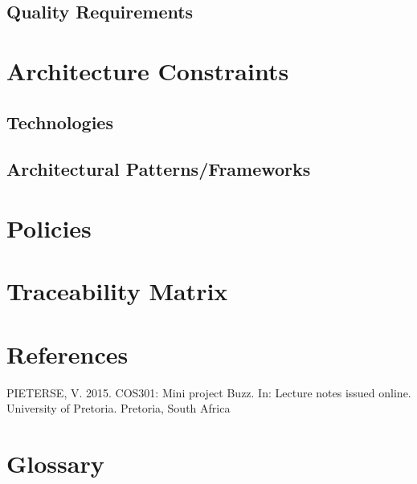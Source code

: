 \documentclass[a4paper]{article}
\begin{document}
\subsection{Quality Requirements}

\section{Architecture Constraints}
\subsection{Technologies}
\subsection{Architectural Patterns/Frameworks}

\section{Policies}

\section{Traceability Matrix}

\section{References}
PIETERSE, V. 2015. COS301: Mini project Buzz. In: Lecture notes issued online. University of Pretoria. Pretoria, South Africa

\section{Glossary}
\end{document}

